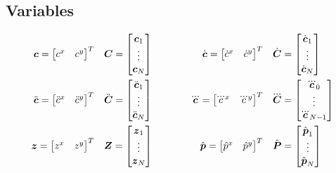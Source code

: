 \documentclass[12pt,a4paper]{article}
\begin{document}
\subsection{Variables}
\begin{align*}
\cpos = \begin{bmatrix} c^x & c^y \end{bmatrix}^T
\quad&
\cPos = \begin{bmatrix} \cpos_1 \\ \vdots \\ \cpos_N \end{bmatrix}
\quad\quad\quad&
\cvel = \begin{bmatrix} \dot{c}^x & \dot{c}^y \end{bmatrix}^T
\quad&
\cVel = \begin{bmatrix} \cvel_1 \\ \vdots \\ \cvel_N \end{bmatrix}
\\
%
\cacc = \begin{bmatrix} \ddot{c}^x & \ddot{c}^y \end{bmatrix}^T
\quad&
\cAcc = \begin{bmatrix} \cacc_1 \\ \vdots \\ \cacc_N \end{bmatrix}
\quad\quad\quad&
\cjerk = \begin{bmatrix} \dddot{c}^x & \dddot{c}^y \end{bmatrix}^T
\quad&
\cJerk = \begin{bmatrix} \cjerk_0 \\ \vdots \\ \cjerk_{N-1} \end{bmatrix}
\\
%
\zmp = \begin{bmatrix} z^x & z^y \end{bmatrix}^T
\quad &
\ZMP = \begin{bmatrix} \zmp_1 \\ \vdots \\ \zmp_N \end{bmatrix}
\quad\quad\quad&
\fph = \begin{bmatrix} \hat{p}^x & \hat{p}^y \end{bmatrix}^T
\quad &
\FPh = \begin{bmatrix} \fph_1 \\ \vdots \\ \fph_N \end{bmatrix}

\end{align*}
\end{document}
